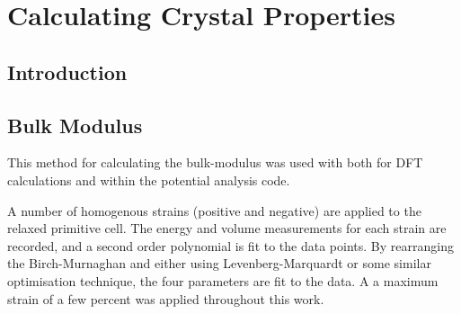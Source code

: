 \section{Calculating Crystal Properties}

\subsection{Introduction}


\subsection{Bulk Modulus}

This method for calculating the bulk-modulus was used with both for DFT calculations and within the potential analysis code.

\eqBirchMurnaghan

A number of homogenous strains (positive and negative) are applied to the relaxed primitive cell.  The energy and volume measurements for each strain are recorded, and a second order polynomial is fit to the data points.  By rearranging the Birch-Murnaghan and either using Levenberg-Marquardt or some similar optimisation technique, the four parameters are fit to the data.  A a maximum strain of a few percent was applied throughout this work.



